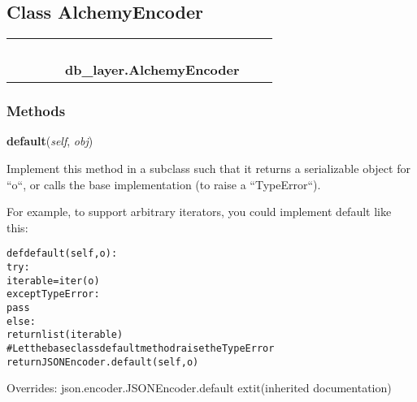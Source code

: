 
\subsection{Class AlchemyEncoder}

    \label{db_layer:AlchemyEncoder}
\begin{tabular}{cccccccc}
\multicolumn{2}{r}{\settowidth{\BCL}{object}\multirow{2}{\BCL}{object}}
&&
&&
  \\\cline{3-3}
  &&\multicolumn{1}{c|}{}
&&
&&
  \\
\multicolumn{4}{r}{\settowidth{\BCL}{json.encoder.JSONEncoder}\multirow{2}{\BCL}{json.encoder.JSONEncoder}}
&&
  \\\cline{5-5}
  &&&&\multicolumn{1}{c|}{}
&&
  \\
&&&&\multicolumn{2}{l}{\textbf{db\_layer.AlchemyEncoder}}
\end{tabular}



  \subsubsection{Methods}

    \vspace{0.5ex}

\hspace{.8\funcindent}\begin{boxedminipage}{\funcwidth}

    \raggedright \textbf{default}(\textit{self}, \textit{obj})

\setlength{\parskip}{2ex}
    Implement this method in a subclass such that it returns a serializable
    object for ``o``, or calls the base implementation (to raise a 
    ``TypeError``).

    For example, to support arbitrary iterators, you could implement 
    default like this:

\begin{alltt}
   def default(self, o):
       try:
           iterable = iter(o)
       except TypeError:
           pass
       else:
           return list(iterable)
       \# Let the base class default method raise the TypeError
       return JSONEncoder.default(self, o)\end{alltt}

\setlength{\parskip}{1ex}
      Overrides: json.encoder.JSONEncoder.default 	extit{(inherited documentation)}

    \end{boxedminipage}


